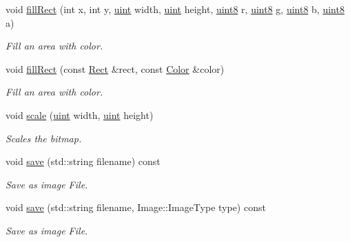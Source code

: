 \begin{DoxyCompactItemize}
void \hyperlink{class_f2_c_1_1_bitmap_af2961f38837be847f9e6a283ea90ba9b}{fillRect} (int x, int y, \hyperlink{namespace_f2_c_a58be2bac9eb3e3c99cb41b6008bf4fae}{uint} width, \hyperlink{namespace_f2_c_a58be2bac9eb3e3c99cb41b6008bf4fae}{uint} height, \hyperlink{namespace_f2_c_a711deb33697d145669b9c0c4fe87c7ca}{uint8} r, \hyperlink{namespace_f2_c_a711deb33697d145669b9c0c4fe87c7ca}{uint8} g, \hyperlink{namespace_f2_c_a711deb33697d145669b9c0c4fe87c7ca}{uint8} b, \hyperlink{namespace_f2_c_a711deb33697d145669b9c0c4fe87c7ca}{uint8} a)
\begin{DoxyCompactList}\small\item\em Fill an area with color. \item\end{DoxyCompactList}\item 
void \hyperlink{class_f2_c_1_1_bitmap_abe81c235fd6bdd3a4300a20395425039}{fillRect} (const \hyperlink{class_f2_c_1_1_rect}{Rect} \&rect, const \hyperlink{class_f2_c_1_1_color}{Color} \&color)
\begin{DoxyCompactList}\small\item\em Fill an area with color. \item\end{DoxyCompactList}\item 
void \hyperlink{class_f2_c_1_1_bitmap_aad1cdb8e6ce4ba8d5bc75123f7fee59a}{scale} (\hyperlink{namespace_f2_c_a58be2bac9eb3e3c99cb41b6008bf4fae}{uint} width, \hyperlink{namespace_f2_c_a58be2bac9eb3e3c99cb41b6008bf4fae}{uint} height)
\begin{DoxyCompactList}\small\item\em Scales the bitmap. \item\end{DoxyCompactList}\item 
void \hyperlink{class_f2_c_1_1_bitmap_af298fcc1f31a045503a0fa8ac6ff9b8b}{save} (std::string filename) const 
\begin{DoxyCompactList}\small\item\em Save as image File. \item\end{DoxyCompactList}\item 
void \hyperlink{class_f2_c_1_1_bitmap_aa31db41325bf9cf8e82c72bf407f1026}{save} (std::string filename, Image::ImageType type) const 
\begin{DoxyCompactList}\small\item\em Save as image File. \item\end{DoxyCompactList}\item 

\end{DoxyCompactItemize}
